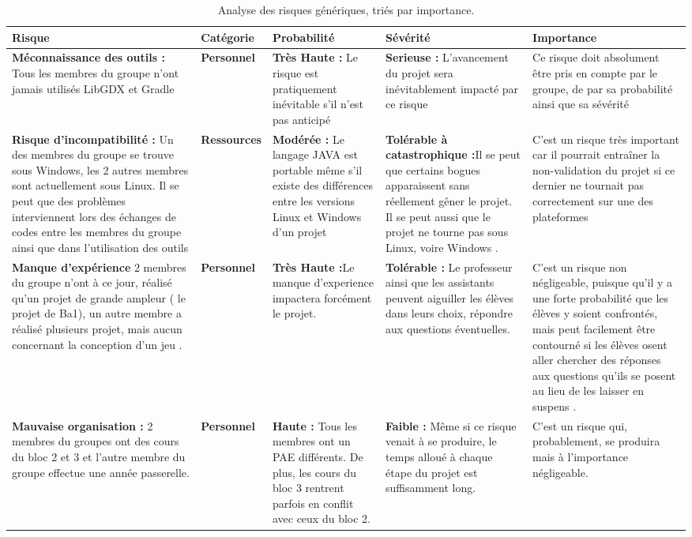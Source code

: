 \documentclass[]{article}
\begin{document}
\begin{table}[!htbp]
\begin{center}
\begin{tabular}{|p{3cm}|p{2.5cm}||p{3cm}|p{3cm}|p{2.5cm}|}
\hline
\textbf{Risque} & Catégorie & Probabilité & Sévérité & Importance\\
\hline\hline
\textbf{Méconnaissance des outils : }Tous les membres du groupe
n'ont jamais utilisés LibGDX et Gradle&\textbf{Personnel}&\textbf{Très Haute : } Le risque est pratiquement inévitable s'il n'est pas
anticipé &\textbf{Serieuse :} L'avancement du projet sera inévitablement impacté par ce risque &Ce risque doit 
absolument être pris en compte par le groupe, de par sa probabilité ainsi que sa sévérité\\
\hline
\textbf{Risque d'incompatibilité :} Un des membres du groupe se trouve sous Windows, les 2 autres membres sont actuellement sous Linux. Il se peut que des problèmes 
interviennent lors des échanges de codes entre les membres du groupe ainsi que dans l'utilisation des outils &\textbf{Ressources} &\textbf{Modérée :} Le langage JAVA est portable même s'il
existe des différences entre les versions Linux et Windows d'un projet &\textbf{Tolérable à catastrophique :}Il se peut que certains bogues apparaissent
sans réellement gêner le projet. Il se peut aussi que le projet ne tourne pas sous Linux, voire Windows .& C'est un risque
très important car il pourrait entraîner la non-validation du projet si ce dernier ne tournait pas correctement sur une des plateformes\\
\hline
\textbf{Manque d'expérience } 2 membres du groupe n'ont à ce jour, réalisé qu'un projet de grande ampleur ( le projet de Ba1), un 
autre membre a réalisé plusieurs projet, mais aucun concernant la conception d'un jeu .
&\textbf{Personnel} &\textbf{Très Haute :}Le manque d'experience impactera forcément le projet.&\textbf{Tolérable : }
Le professeur ainsi que les assistants peuvent aiguiller les élèves dans leurs choix, répondre aux questions éventuelles.& C'est un risque non négligeable, puisque 
qu'il y a une forte probabilité que les élèves y soient confrontés, mais peut facilement être contourné si les élèves osent aller chercher des réponses
aux questions qu'ils se posent au lieu de les laisser en suspens .\\
\hline
\textbf{Mauvaise organisation :} 2 membres du groupes ont des cours du
bloc 2 et 3 et l'autre membre du groupe effectue une année passerelle.&\textbf{Personnel} &\textbf{Haute : }Tous les membres ont un PAE différents.
De plus, les cours du bloc 3 rentrent parfois en conflit avec ceux du bloc 2. &\textbf{Faible :} Même si ce risque venait à se produire, le temps 
alloué à chaque étape du projet est suffisamment long. & C'est un risque qui, probablement, se produira mais à l'importance négligeable. \\
\hline
\end{tabular}
\end{center}
   \caption{Analyse des risques génériques, triés par importance.}
   \label{tab:risquesspecifiques}
\end{table}
\end{document}
